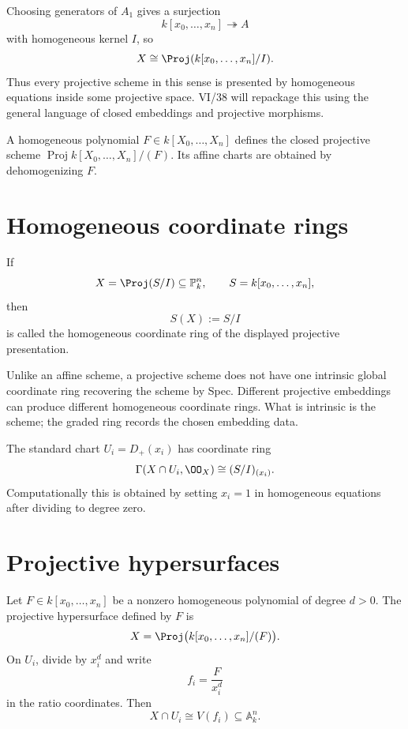 Choosing generators of \(A_1\) gives a surjection
\[
  k[x_0,\ldots,x_n]\twoheadrightarrow A
\]
with homogeneous kernel \(I\), so
\[
  X\cong\Proj(k[x_0,\ldots,x_n]/I).
\]
Thus every projective scheme in this sense is presented by homogeneous equations inside some projective space.  VI/38 will repackage this using the general language of closed embeddings and projective morphisms.

\begin{example}\label{ex:vi37-expand-01}
A homogeneous polynomial $F\in k[X_0,\ldots,X_n]$ defines the closed projective scheme $\operatorname{Proj}k[X_0,\ldots,X_n]/(F)$.  Its affine charts are obtained by dehomogenizing $F$.
\end{example}
\section{Homogeneous coordinate rings}
If
\[
  X=\Proj(S/I)\subseteq\mathbb P^n_k,
  \qquad S=k[x_0,\ldots,x_n],
\]
then
\[
  S(X):=S/I
\]
is called the homogeneous coordinate ring of the displayed projective presentation.

\begin{remark}
Unlike an affine scheme, a projective scheme does not have one intrinsic global coordinate ring recovering the scheme by Spec.  Different projective embeddings can produce different homogeneous coordinate rings.  What is intrinsic is the scheme; the graded ring records the chosen embedding data.
\end{remark}

The standard chart \(U_i=D_+(x_i)\) has coordinate ring
\[
  \Gamma(X\cap U_i,\OO_X)
  \cong (S/I)_{(x_i)}.
\]
Computationally this is obtained by setting \(x_i=1\) in homogeneous equations after dividing to degree zero.



\section{Projective hypersurfaces}
Let \(F\in k[x_0,\ldots,x_n]\) be a nonzero homogeneous polynomial of degree \(d>0\).  The projective hypersurface defined by \(F\) is
\[
  X=\Proj\bigl(k[x_0,\ldots,x_n]/(F)\bigr).
\]
On \(U_i\), divide by \(x_i^d\) and write
\[
  f_i=\frac{F}{x_i^d}
\]
in the ratio coordinates.  Then
\[
  X\cap U_i\cong V(f_i)\subseteq\mathbb A^n_k.
\]

